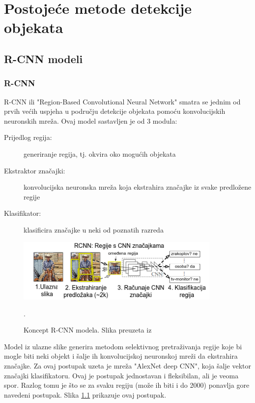 \chapter{Postojeće metode detekcije objekata}


\section{R-CNN modeli}
\subsection{R-CNN} 
R-CNN ili "Region-Based Convolutional Neural Network" smatra se jednim od prvih većih
uspjeha u području detekcije objekata pomoću konvolucijskih neuronskih mreža.\citep{bworld}\newline
Ovaj model sastavljen je od 3 modula: 
\begin{description}
    \item [Prijedlog regija:]generiranje regija, tj. okvira oko mogućih objekata
    \item [Ekstraktor značajki:]konvolucijska neuronska mreža koja ekstrahira značajke iz svake predložene regije
    \item [Klasifikator:]klasificira značajke u neki od poznatih razreda
\end{description}


\begin{figure}[b]
    \centering
    \includegraphics[width=10cm]{img/R-CNN.png}
    \caption{Koncept R-CNN modela. Slika preuzeta iz \citep{DBLP:journals/corr/GirshickDDM13}}.
    \label{fig:Koncept R-CNN modela}
\end{figure}

Model iz ulazne slike generira metodom selektivnog pretraživanja  regije koje bi mogle biti neki objekt
i šalje ih konvolucijskoj neuronskoj mreži da ekstrahira značajke. Za ovaj postupak uzeta je mreža "AlexNet deep CNN", koja 
šalje vektor značajki klasifikatoru.
Ovaj je postupak jednostavan i fleksibilan, ali je veoma spor. Razlog tomu je što se za svaku regiju (može ih biti i do 2000)
ponavlja gore navedeni postupak.\citep{DBLP:journals/corr/GirshickDDM13} \newline Slika \ref{fig:Koncept R-CNN modela} prikazuje ovaj postupak.
    


